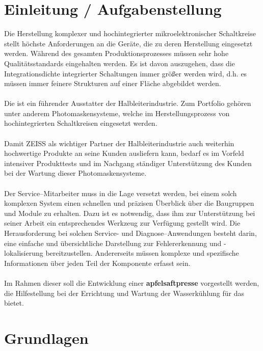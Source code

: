 \chapter{Einleitung / Aufgabenstellung}
Die Herstellung komplexer und hochintegrierter mikroelektronischer Schaltkreise stellt höchste Anforderungen an die Geräte,
die zu deren Herstellung eingesetzt werden.
Während des gesamten Produktionsprozesses müssen sehr hohe Qualitätsstandards eingehalten werden.
Es ist davon auszugehen, dass die Integrationsdichte integrierter Schaltungen immer größer werden wird, d.h. es müssen immer feinere Strukturen auf einer Fläche abgebildet werden.
\\\\
Die {\betrieb} ist ein führender Ausstatter der Halbleiterindustrie.
Zum Portfolio gehören unter anderem Photomaskensysteme, welche im Herstellungsprozess von hochintegrierten Schaltkreisen eingesetzt werden.
\\\\
Damit ZEISS als wichtiger Partner der Halbleiterindustrie auch weiterhin hochwertige Produkte an seine Kunden ausliefern kann, bedarf es im Vorfeld intensiver Produkttests und im Nachgang ständiger Unterstützung des Kunden bei der Wartung dieser Photomaskensysteme.
\\\\
Der Service--Mitarbeiter muss in die Lage versetzt werden, bei einem solch komplexen System
einen schnellen und präzisen Überblick über die Baugruppen und Module zu erhalten.
Dazu ist es notwendig, dass ihm zur Unterstützung bei seiner Arbeit ein entsprechendes Werkzeug zur Verfügung gestellt wird.
Die Herausforderung bei solchen Service- und Diagnose--Anwendungen besteht darin, eine einfache und übersichtliche Darstellung zur Fehlererkennung und -lokalisierung bereitzustellen. Andererseits müssen komplexe und spezifische Informationen über jeden Teil der Komponente erfasst sein.
\\\\
Im Rahmen dieser {\arbeit} soll die Entwicklung einer \textbf{apfelsaftpresse} vorgestellt werden, die Hilfestellung bei der Errichtung und Wartung der Wasserkühlung für das {\aimseuv} bietet.


\chapter{Grundlagen}
 
